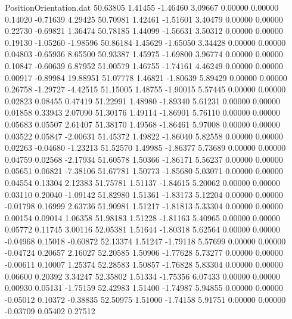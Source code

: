 \begin{filecontents}{PositionOrientation.dat}
  50.63805    1.41455   -1.46460     3.09667    0.00000    0.00000    0.14020   -0.71639    4.29425
  50.70981    1.42461   -1.51601     3.40479    0.00000    0.00000    0.22730   -0.69821    1.36474
  50.78185    1.44099   -1.56631     3.50312    0.00000    0.00000    0.19130   -1.05260   -1.98596
  50.86184    1.45629   -1.65050     3.34428    0.00000    0.00000    0.04803   -0.65936    8.65500
  50.93387    1.45975   -1.69800     3.96774    0.00000    0.00000    0.10847   -0.60639    6.87952
  51.00579    1.46755   -1.74161     4.46249    0.00000    0.00000    0.00917   -0.89984   19.88951
  51.07778    1.46821   -1.80639     5.89429    0.00000    0.00000    0.26758   -1.29727   -4.42515
  51.15005    1.48755   -1.90015     5.57445    0.00000    0.00000    0.02823    0.08455    0.47419
  51.22991    1.48980   -1.89340     5.61231    0.00000    0.00000    0.01858    0.33943    2.07090
  51.30176    1.49114   -1.86901     5.76110    0.00000    0.00000    0.05683    0.05507    2.61407
  51.38170    1.49568   -1.86461     5.97008    0.00000    0.00000    0.03522    0.05847   -2.00631
  51.45372    1.49822   -1.86040     5.82558    0.00000    0.00000    0.02263   -0.04680   -1.23213
  51.52570    1.49985   -1.86377     5.73689    0.00000    0.00000    0.04759    0.02568   -2.17934
  51.60578    1.50366   -1.86171     5.56237    0.00000    0.00000    0.05651    0.06821   -7.38106
  51.67781    1.50773   -1.85680     5.03071    0.00000    0.00000    0.04554    0.13304    2.12383
  51.75781    1.51137   -1.84615     5.20062    0.00000    0.00000    0.03110    0.20040   -1.09142
  51.82980    1.51361   -1.83173     5.12204    0.00000    0.00000   -0.01798    0.16999    2.63736
  51.90981    1.51217   -1.81813     5.33304    0.00000    0.00000    0.00154    0.09014    1.06358
  51.98183    1.51228   -1.81163     5.40965    0.00000    0.00000    0.05772    0.11745    3.00116
  52.05381    1.51644   -1.80318     5.62564    0.00000    0.00000   -0.04968    0.15018   -0.60872
  52.13374    1.51247   -1.79118     5.57699    0.00000    0.00000   -0.04724    0.20657    2.16027
  52.20585    1.50906   -1.77628     5.73277    0.00000    0.00000   -0.00611    0.10007    1.25374
  52.28583    1.50857   -1.76828     5.83304    0.00000    0.00000    0.06600    0.20392    3.34247
  52.35802    1.51334   -1.75356     6.07433    0.00000    0.00000    0.00930    0.05131   -1.75159
  52.42983    1.51400   -1.74987     5.94855    0.00000    0.00000   -0.05012    0.10372   -0.38835
  52.50975    1.51000   -1.74158     5.91751    0.00000    0.00000   -0.03709    0.05402    0.27512

\end{filecontents}
